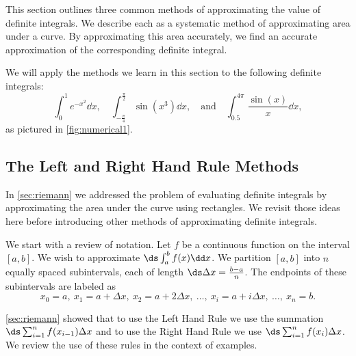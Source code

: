 This section outlines three common methods of approximating the value of definite integrals. We describe each as a systematic method of approximating area under a curve. By approximating this area accurately, we find an accurate approximation of the corresponding definite integral.

We will apply the methods we learn in this section to the following definite integrals:\vspace{-.5\baselineskip}
\[
 \int_0^1 e^{-x^2}\dd x, \quad
 \int_{-\frac{\pi}{4}}^{\frac{\pi}{2}} \sin(x^3)\dd x,
 \quad \text{and} \quad
 \int_{0.5}^{4\pi} \frac{\sin(x)}{x}\dd x,
\]
as pictured in \autoref{fig:numerical1}.

\subsection{The Left and Right Hand Rule Methods}

In \autoref{sec:riemann} we addressed the problem of evaluating definite integrals by approximating the area under the curve using rectangles. We revisit those ideas here before introducing other methods of approximating definite integrals. 

We start with a review of notation. Let $f$ be a continuous function on the interval $[a,b]$. We wish to approximate $\ds \int_a^b f(x)\dd x$. We partition $[a,b]$ into $n$ equally spaced subintervals, each of length $\ds\Delta x = \frac{b-a}{n}$. The endpoints of these subintervals are labeled as
\[x_0=a,\ x_1 = a+\Delta x,\ x_2 = a+ 2\Delta x,\ \dotsc,\ x_i = a+i\Delta x,\ \dotsc,\ x_n = b.\]

\autoref{sec:riemann} showed that to use the Left Hand Rule we use the summation $\ds \sum_{i=1}^n f(x_{i-1})\Delta x$ and to use the Right Hand Rule we use $\ds \sum_{i=1}^n f(x_i)\Delta x$. We review the use of these rules in the context of examples.

